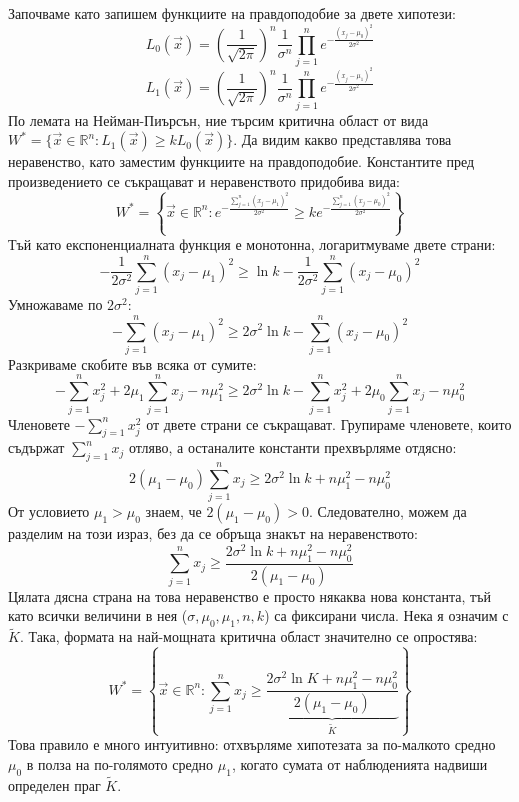 \documentclass{article}
\begin{document}
Започваме като запишем функциите на правдоподобие за двете хипотези:
\[
L_0(\vec{x}) = \left(\frac{1}{\sqrt{2\pi}}\right)^n \frac{1}{\sigma^n} \prod_{j=1}^n e^{-\frac{(x_j - \mu_0)^2}{2\sigma^2}}
\]
\[
L_1(\vec{x}) = \left(\frac{1}{\sqrt{2\pi}}\right)^n \frac{1}{\sigma^n} \prod_{j=1}^n e^{-\frac{(x_j - \mu_1)^2}{2\sigma^2}}
\]
По лемата на Нейман-Пиърсън, ние търсим критична област от вида $W^* = \{ \vec{x} \in \mathbb{R}^n : L_1(\vec{x}) \ge k L_0(\vec{x}) \}$. Да видим какво представлява това неравенство, като заместим функциите на правдоподобие. Константите пред произведението се съкращават и неравенството придобива вида:
\[
W^* = \left\{ \vec{x} \in \mathbb{R}^n : e^{-\frac{\sum_{j=1}^n (x_j - \mu_1)^2}{2\sigma^2}} \ge k e^{-\frac{\sum_{j=1}^n (x_j - \mu_0)^2}{2\sigma^2}} \right\}
\]
Тъй като експоненциалната функция е монотонна, логаритмуваме двете страни:
\[
-\frac{1}{2\sigma^2} \sum_{j=1}^n (x_j - \mu_1)^2 \ge \ln k - \frac{1}{2\sigma^2} \sum_{j=1}^n (x_j - \mu_0)^2
\]
Умножаваме по $2\sigma^2$:
\[
- \sum_{j=1}^n (x_j - \mu_1)^2 \ge 2\sigma^2 \ln k - \sum_{j=1}^n (x_j - \mu_0)^2
\]
Разкриваме скобите във всяка от сумите:
\[
- \sum_{j=1}^n x_j^2 + 2\mu_1 \sum_{j=1}^n x_j - n\mu_1^2 \ge 2\sigma^2 \ln k - \sum_{j=1}^n x_j^2 + 2\mu_0 \sum_{j=1}^n x_j - n\mu_0^2
\]
Членовете $-\sum_{j=1}^n x_j^2$ от двете страни се съкращават. Групираме членовете, които съдържат $\sum_{j=1}^n x_j$ отляво, а останалите константи прехвърляме отдясно:
\[
2(\mu_1 - \mu_0) \sum_{j=1}^n x_j \ge 2\sigma^2 \ln k + n\mu_1^2 - n\mu_0^2
\]
От условието $\mu_1 > \mu_0$ знаем, че $2(\mu_1 - \mu_0) > 0$. Следователно, можем да разделим на този израз, без да се обръща знакът на неравенството:
\[
\sum_{j=1}^n x_j \ge \frac{2\sigma^2 \ln k + n\mu_1^2 - n\mu_0^2}{2(\mu_1 - \mu_0)}
\]
Цялата дясна страна на това неравенство е просто някаква нова константа, тъй като всички величини в нея ($\sigma, \mu_0, \mu_1, n, k$) са фиксирани числа. Нека я означим с $\tilde{K}$.
Така, формата на най-мощната критична област значително се опростява:
\[
W^* = \left\{ \vec{x} \in \mathbb{R}^n : \sum_{j=1}^n x_j \ge \underbrace{\frac{2\sigma^2 \ln K + n\mu_1^2 - n\mu_0^2}{2(\mu_1 - \mu_0)}}_{\tilde{K}} \right\}
\]
Това правило е много интуитивно: отхвърляме хипотезата за по-малкото средно $\mu_0$ в полза на по-голямото средно $\mu_1$, когато сумата от наблюденията надвиши определен праг $\tilde{K}$.
\end{document}
